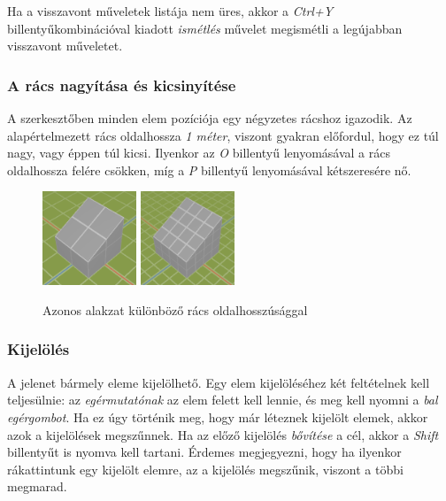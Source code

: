 Ha a visszavont műveletek listája nem üres, akkor a \emph{Ctrl+Y} billentyűkombinációval kiadott
\emph{ismétlés} művelet megismétli a legújabban visszavont műveletet.

\pagebreak

\subsubsection{A rács nagyítása és kicsinyítése}

A szerkesztőben minden elem pozíciója egy négyzetes rácshoz igazodik. Az alapértelmezett rács
oldalhossza \emph{1 méter}, viszont gyakran előfordul, hogy ez túl nagy, vagy éppen túl kicsi.
Ilyenkor az \emph{O} billentyű lenyomásával a rács oldalhossza felére csökken, míg a \emph{P}
billentyű lenyomásával kétszeresére nő.

\begin{figure}[H]
    \centering
    \includegraphics[width=0.25\textwidth]{parts/user-documentation/editor/images/grid_128.png}
    \includegraphics[width=0.25\textwidth]{parts/user-documentation/editor/images/grid_64.png}
    \caption{Azonos alakzat különböző rács oldalhosszúsággal}
\end{figure}

\subsubsection{Kijelölés}

A jelenet bármely eleme kijelölhető. Egy elem kijelöléséhez két feltételnek kell teljesülnie: az
\emph{egérmutatónak} az elem felett kell lennie, és meg kell nyomni a \emph{bal egérgombot}. Ha ez
úgy történik meg, hogy már léteznek kijelölt elemek, akkor azok a kijelölések megszűnnek. Ha az
előző kijelölés \emph{bővítése} a cél, akkor a \emph{Shift} billentyűt is nyomva kell tartani.
Érdemes megjegyezni, hogy ha ilyenkor rákattintunk egy kijelölt elemre, az a kijelölés megszűnik,
viszont a többi megmarad.

